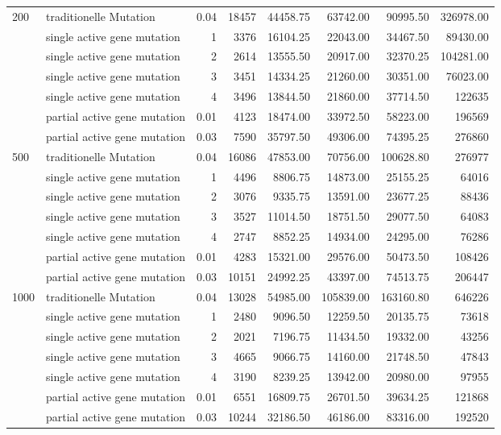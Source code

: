 \begin{table}[!ht]
{\begin{tabular}{ |l|l|r||r|r|r|r|r|}
  \multirow{ 7 }{*}{200}
   & traditionelle Mutation & 0.04 & 18457 & 44458.75 & 63742.00 & 90995.50 & 326978.00 \\
   & single active gene mutation & 1 & 3376 & 16104.25 & 22043.00 & 34467.50 & 89430.00 \\ 
   & single active gene mutation & 2 & 2614 & 13555.50 & 20917.00 & 32370.25 & 104281.00 \\
   & single active gene mutation & 3 & 3451 & 14334.25 & 21260.00 & 30351.00 & 76023.00 \\
   & single active gene mutation & 4 & 3496 & 13844.50 & 21860.00 & 37714.50 & 122635 \\
   & partial active gene mutation & 0.01 & 4123 & 18474.00 & 33972.50 & 58223.00 & 196569 \\
   & partial active gene mutation & 0.03 & 7590 & 35797.50 & 49306.00 & 74395.25 & 276860 \\
      \hline
   
  \multirow{ 7 }{*}{500}
   & traditionelle Mutation & 0.04 & 16086 & 47853.00 & 70756.00 & 100628.80 & 276977 \\
   & single active gene mutation & 1 & 4496 & 8806.75 & 14873.00 & 25155.25 & 64016 \\ 
   & single active gene mutation & 2 & 3076 & 9335.75 & 13591.00 & 23677.25 & 88436 \\
   & single active gene mutation & 3 & 3527 & 11014.50 & 18751.50 & 29077.50 & 64083 \\
   & single active gene mutation & 4 & 2747 & 8852.25 & 14934.00 & 24295.00 & 76286 \\
   & partial active gene mutation & 0.01 & 4283 & 15321.00 & 29576.00 & 50473.50 & 108426 \\
   & partial active gene mutation & 0.03 & 10151 & 24992.25 & 43397.00 & 74513.75 & 206447 \\
      \hline
    
  \multirow{ 7 }{*}{1000} 
   & traditionelle Mutation & 0.04 & 13028 & 54985.00 & 105839.00 & 163160.80 & 646226 \\
   & single active gene mutation & 1 & 2480 & 9096.50 & 12259.50 & 20135.75 & 73618 \\ 
   & single active gene mutation & 2 & 2021 & 7196.75 & 11434.50 & 19332.00 & 43256 \\
   & single active gene mutation & 3 & 4665 & 9066.75 & 14160.00 & 21748.50 & 47843 \\
   & single active gene mutation & 4 & 3190 & 8239.25 & 13942.00 & 20980.00 & 97955 \\
   & partial active gene mutation & 0.01 & 6551 & 16809.75 & 26701.50 & 39634.25 & 121868 \\
   & partial active gene mutation & 0.03 & 10244 & 32186.50 & 46186.00 & 83316.00 & 192520 \\
      \hline

\end{tabular}
}
\label{table_meta3}
\end{table}


